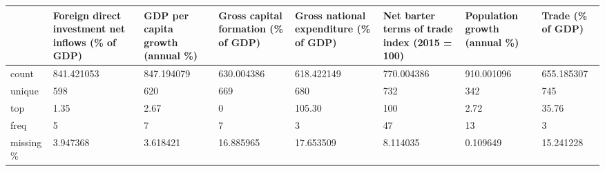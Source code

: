 \begin{tabular}{llllllll}
\toprule
{} & Foreign direct investment net inflows (\% of GDP) & GDP per capita growth (annual \%) & Gross capital formation (\% of GDP) & Gross national expenditure (\% of GDP) & Net barter terms of trade index (2015 = 100) & Population growth (annual \%) & Trade (\% of GDP) \\
\midrule
count     &                                       841.421053 &                       847.194079 &                         630.004386 &                            618.422149 &                                   770.004386 &                   910.001096 &       655.185307 \\
unique    &                                              598 &                              620 &                                669 &                                   680 &                                          732 &                          342 &              745 \\
top       &                                             1.35 &                             2.67 &                                  0 &                                105.30 &                                          100 &                         2.72 &            35.76 \\
freq      &                                                5 &                                7 &                                  7 &                                     3 &                                           47 &                           13 &                3 \\
missing \% &                                         3.947368 &                         3.618421 &                          16.885965 &                             17.653509 &                                     8.114035 &                     0.109649 &        15.241228 \\
\bottomrule
\end{tabular}
